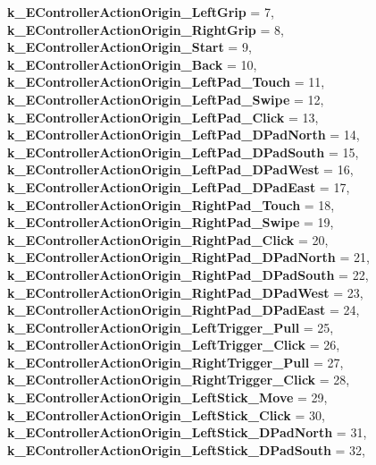 \begin{DoxyCompactItemize}
{\bfseries k\+\_\+\+E\+Controller\+Action\+Origin\+\_\+\+Left\+Grip} = 7, 
\newline
{\bfseries k\+\_\+\+E\+Controller\+Action\+Origin\+\_\+\+Right\+Grip} = 8, 
{\bfseries k\+\_\+\+E\+Controller\+Action\+Origin\+\_\+\+Start} = 9, 
{\bfseries k\+\_\+\+E\+Controller\+Action\+Origin\+\_\+\+Back} = 10, 
{\bfseries k\+\_\+\+E\+Controller\+Action\+Origin\+\_\+\+Left\+Pad\+\_\+\+Touch} = 11, 
\newline
{\bfseries k\+\_\+\+E\+Controller\+Action\+Origin\+\_\+\+Left\+Pad\+\_\+\+Swipe} = 12, 
{\bfseries k\+\_\+\+E\+Controller\+Action\+Origin\+\_\+\+Left\+Pad\+\_\+\+Click} = 13, 
{\bfseries k\+\_\+\+E\+Controller\+Action\+Origin\+\_\+\+Left\+Pad\+\_\+\+D\+Pad\+North} = 14, 
{\bfseries k\+\_\+\+E\+Controller\+Action\+Origin\+\_\+\+Left\+Pad\+\_\+\+D\+Pad\+South} = 15, 
\newline
{\bfseries k\+\_\+\+E\+Controller\+Action\+Origin\+\_\+\+Left\+Pad\+\_\+\+D\+Pad\+West} = 16, 
{\bfseries k\+\_\+\+E\+Controller\+Action\+Origin\+\_\+\+Left\+Pad\+\_\+\+D\+Pad\+East} = 17, 
{\bfseries k\+\_\+\+E\+Controller\+Action\+Origin\+\_\+\+Right\+Pad\+\_\+\+Touch} = 18, 
{\bfseries k\+\_\+\+E\+Controller\+Action\+Origin\+\_\+\+Right\+Pad\+\_\+\+Swipe} = 19, 
\newline
{\bfseries k\+\_\+\+E\+Controller\+Action\+Origin\+\_\+\+Right\+Pad\+\_\+\+Click} = 20, 
{\bfseries k\+\_\+\+E\+Controller\+Action\+Origin\+\_\+\+Right\+Pad\+\_\+\+D\+Pad\+North} = 21, 
{\bfseries k\+\_\+\+E\+Controller\+Action\+Origin\+\_\+\+Right\+Pad\+\_\+\+D\+Pad\+South} = 22, 
{\bfseries k\+\_\+\+E\+Controller\+Action\+Origin\+\_\+\+Right\+Pad\+\_\+\+D\+Pad\+West} = 23, 
\newline
{\bfseries k\+\_\+\+E\+Controller\+Action\+Origin\+\_\+\+Right\+Pad\+\_\+\+D\+Pad\+East} = 24, 
{\bfseries k\+\_\+\+E\+Controller\+Action\+Origin\+\_\+\+Left\+Trigger\+\_\+\+Pull} = 25, 
{\bfseries k\+\_\+\+E\+Controller\+Action\+Origin\+\_\+\+Left\+Trigger\+\_\+\+Click} = 26, 
{\bfseries k\+\_\+\+E\+Controller\+Action\+Origin\+\_\+\+Right\+Trigger\+\_\+\+Pull} = 27, 
\newline
{\bfseries k\+\_\+\+E\+Controller\+Action\+Origin\+\_\+\+Right\+Trigger\+\_\+\+Click} = 28, 
{\bfseries k\+\_\+\+E\+Controller\+Action\+Origin\+\_\+\+Left\+Stick\+\_\+\+Move} = 29, 
{\bfseries k\+\_\+\+E\+Controller\+Action\+Origin\+\_\+\+Left\+Stick\+\_\+\+Click} = 30, 
{\bfseries k\+\_\+\+E\+Controller\+Action\+Origin\+\_\+\+Left\+Stick\+\_\+\+D\+Pad\+North} = 31, 
\newline
{\bfseries k\+\_\+\+E\+Controller\+Action\+Origin\+\_\+\+Left\+Stick\+\_\+\+D\+Pad\+South} = 32, 

\end{DoxyCompactItemize}
